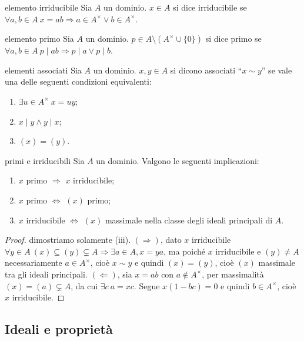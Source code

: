 \begin{definition}{elemento irriducibile}
    Sia $A$ un dominio. $x \in A$ si dice irriducibile se $\forall a, b \in A \ x = ab \Rightarrow a \in A^\times \lor b \in A^\times$.
\end{definition}
\begin{definition}{elemento primo}
    Sia $A$ un dominio. $p \in A \setminus (A^\times \cup \{ 0 \})$ si dice primo se $\forall a, b \in A \ p \mid ab \Rightarrow p \mid a \lor p \mid b$.
\end{definition}
\begin{definition}{elementi associati}
    Sia $A$ un dominio. $x,y \in A$ si dicono associati ``$x \sim y$'' se vale una delle seguenti condizioni equivalenti:
    \begin{enumerate}[label=(\roman*)]
        \item $\exists u \in A^\times \ x = uy$;
        \item $x \mid y \land y \mid x$;
        \item $(x) = (y)$.
    \end{enumerate}
\end{definition}
\begin{proposition}{primi e irriducibili}
    Sia $A$ un dominio. Valgono le seguenti implicazioni:
    \begin{enumerate}[label=(\roman*)]
        \item $x$ primo $\Rightarrow$ $x$ irriducibile;
        \item $x$ primo $\Leftrightarrow$ $(x)$ primo;
        \item $x$ irriducibile $\Leftrightarrow$ $(x)$ massimale nella classe degli ideali principali di $A$.
    \end{enumerate}
\end{proposition}
\begin{proof}
    dimostriamo solamente (iii). $(\Rightarrow)$, dato $x$ irriducibile $\forall y \in A \ (x) \subseteq (y) \subsetneq A \Rightarrow \exists a \in A, x = ya$, ma poiché $x$ irriducibile e $(y) \neq A$ necessariamente $a \in A^\times$, cioè $x \sim y$ e quindi $(x) = (y)$, cioè $(x)$ massimale tra gli ideali principali. $(\Leftarrow)$, sia $x = ab$ con $a \notin A^\times$, per massimalità $(x) = (a) \subsetneq A$, da cui $\exists c \ a = xc$. Segue $x(1 - bc) = 0$ e quindi $b \in A^\times$, cioè $x$ irriducibile.
\end{proof}

\subsection{Ideali e proprietà}

